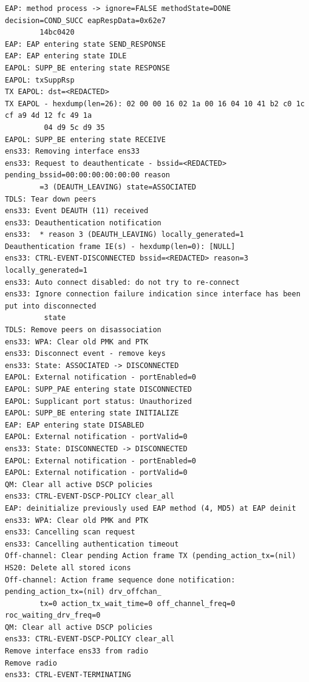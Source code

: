 \documentclass[11pt]{article}
\begin{document}
\begin{verbatim}
EAP: method process -> ignore=FALSE methodState=DONE decision=COND_SUCC eapRespData=0x62e7
        14bc0420
EAP: EAP entering state SEND_RESPONSE
EAP: EAP entering state IDLE
EAPOL: SUPP_BE entering state RESPONSE
EAPOL: txSuppRsp
TX EAPOL: dst=<REDACTED>
TX EAPOL - hexdump(len=26): 02 00 00 16 02 1a 00 16 04 10 41 b2 c0 1c cf a9 4d 12 fc 49 1a
         04 d9 5c d9 35
EAPOL: SUPP_BE entering state RECEIVE
ens33: Removing interface ens33
ens33: Request to deauthenticate - bssid=<REDACTED> pending_bssid=00:00:00:00:00:00 reason
        =3 (DEAUTH_LEAVING) state=ASSOCIATED
TDLS: Tear down peers
ens33: Event DEAUTH (11) received
ens33: Deauthentication notification
ens33:  * reason 3 (DEAUTH_LEAVING) locally_generated=1
Deauthentication frame IE(s) - hexdump(len=0): [NULL]
ens33: CTRL-EVENT-DISCONNECTED bssid=<REDACTED> reason=3 locally_generated=1
ens33: Auto connect disabled: do not try to re-connect
ens33: Ignore connection failure indication since interface has been put into disconnected
         state
TDLS: Remove peers on disassociation
ens33: WPA: Clear old PMK and PTK
ens33: Disconnect event - remove keys
ens33: State: ASSOCIATED -> DISCONNECTED
EAPOL: External notification - portEnabled=0
EAPOL: SUPP_PAE entering state DISCONNECTED
EAPOL: Supplicant port status: Unauthorized
EAPOL: SUPP_BE entering state INITIALIZE
EAP: EAP entering state DISABLED
EAPOL: External notification - portValid=0
ens33: State: DISCONNECTED -> DISCONNECTED
EAPOL: External notification - portEnabled=0
EAPOL: External notification - portValid=0
QM: Clear all active DSCP policies
ens33: CTRL-EVENT-DSCP-POLICY clear_all
EAP: deinitialize previously used EAP method (4, MD5) at EAP deinit
ens33: WPA: Clear old PMK and PTK
ens33: Cancelling scan request
ens33: Cancelling authentication timeout
Off-channel: Clear pending Action frame TX (pending_action_tx=(nil)
HS20: Delete all stored icons
Off-channel: Action frame sequence done notification: pending_action_tx=(nil) drv_offchan_
        tx=0 action_tx_wait_time=0 off_channel_freq=0 roc_waiting_drv_freq=0
QM: Clear all active DSCP policies
ens33: CTRL-EVENT-DSCP-POLICY clear_all
Remove interface ens33 from radio 
Remove radio 
ens33: CTRL-EVENT-TERMINATING 
\end{verbatim}

\end{document}

